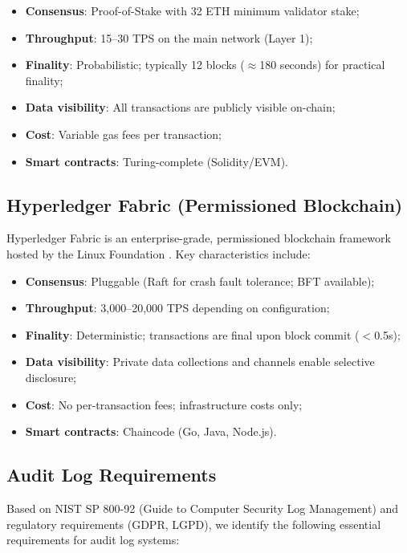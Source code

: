 \documentclass[12pt,a4paper]{article}
\begin{document}
\begin{itemize}
    \item \textbf{Consensus}: Proof-of-Stake with 32 ETH minimum validator stake;
    \item \textbf{Throughput}: 15--30 TPS on the main network (Layer 1);
    \item \textbf{Finality}: Probabilistic; typically 12 blocks ($\approx$180 seconds) for practical finality;
    \item \textbf{Data visibility}: All transactions are publicly visible on-chain;
    \item \textbf{Cost}: Variable gas fees per transaction;
    \item \textbf{Smart contracts}: Turing-complete (Solidity/EVM).
\end{itemize}

\subsection{Hyperledger Fabric (Permissioned Blockchain)}

Hyperledger Fabric is an enterprise-grade, permissioned blockchain framework hosted by the Linux Foundation \cite{hyperledger2024}. Key characteristics include:

\begin{itemize}
    \item \textbf{Consensus}: Pluggable (Raft for crash fault tolerance; BFT available);
    \item \textbf{Throughput}: 3,000--20,000 TPS depending on configuration;
    \item \textbf{Finality}: Deterministic; transactions are final upon block commit ($<$0.5s);
    \item \textbf{Data visibility}: Private data collections and channels enable selective disclosure;
    \item \textbf{Cost}: No per-transaction fees; infrastructure costs only;
    \item \textbf{Smart contracts}: Chaincode (Go, Java, Node.js).
\end{itemize}

\subsection{Audit Log Requirements}

Based on NIST SP 800-92 (Guide to Computer Security Log Management) \cite{nist2006logging} and regulatory requirements (GDPR, LGPD), we identify the following essential requirements for audit log systems:
\end{document}
